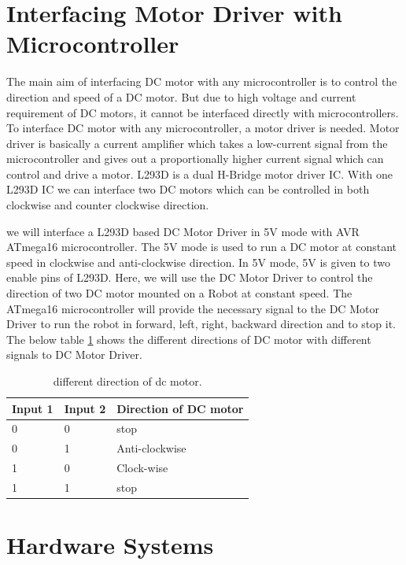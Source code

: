 \documentclass[12pt, a4paper, twoside]{report}
\begin{document}
\section{Interfacing Motor Driver with Microcontroller}
The main aim of interfacing DC motor with any microcontroller is to control the direction and speed of a DC motor. But due to high voltage and current requirement of DC motors, it cannot be interfaced directly with microcontrollers. To interface DC motor with any microcontroller, a motor driver is needed. Motor driver is basically a current amplifier which takes a low-current signal from the microcontroller and gives out a proportionally higher current signal which can control and drive a motor. L293D is a dual H-Bridge motor driver IC. With one L293D IC we can interface two DC motors which can be controlled in both clockwise and counter clockwise direction.
\par
we will interface a L293D based DC Motor Driver in 5V mode with AVR ATmega16 microcontroller. The 5V mode is used to run a DC motor at constant speed in clockwise and anti-clockwise direction. In 5V mode, 5V is given to two enable pins of L293D. Here, we will use the DC Motor Driver to control the direction of two DC motor mounted on a Robot at constant speed. The ATmega16 microcontroller will provide the necessary signal to the DC Motor Driver to run the robot in forward, left, right, backward direction and to stop it. The below table \ref{tab:dc-motor} shows the different directions of DC motor with different signals to DC Motor Driver.
\begin{table}[]
\centering
\begin{tabular}{|l|l|l|}
\hline
\textbf{Input 1} & \textbf{Input 2} & \textbf{Direction of DC motor} \\ \hline
0                & 0                & stop                           \\ \hline
0                & 1                & Anti-clockwise                 \\ \hline
1                & 0                & Clock-wise                     \\ \hline
1                & 1                & stop                           \\ \hline
\end{tabular}
\caption{different direction of dc motor.}
\label{tab:dc-motor}
\end{table}

\section{Hardware Systems}
\end{document}

